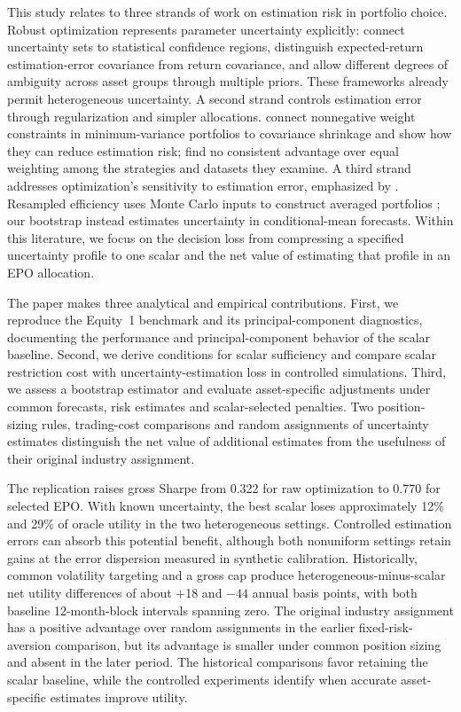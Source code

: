 This study relates to three strands of work on estimation risk in portfolio choice. Robust optimization represents parameter uncertainty explicitly: \citet{goldfarb2003} connect uncertainty sets to statistical confidence regions, \citet{ceria2006} distinguish expected-return estimation-error covariance from return covariance, and \citet{garlappi2007} allow different degrees of ambiguity across asset groups through multiple priors. These frameworks already permit heterogeneous uncertainty. A second strand controls estimation error through regularization and simpler allocations. \citet{jagannathan2003} connect nonnegative weight constraints in minimum-variance portfolios to covariance shrinkage and show how they can reduce estimation risk; \citet{demiguel2009} find no consistent advantage over equal weighting among the strategies and datasets they examine. A third strand addresses optimization's sensitivity to estimation error, emphasized by \citet{michaud1989}. Resampled efficiency uses Monte Carlo inputs to construct averaged portfolios \citep[Chapter~6]{michaud2008}; our bootstrap instead estimates uncertainty in conditional-mean forecasts. Within this literature, we focus on the decision loss from compressing a specified uncertainty profile to one scalar and the net value of estimating that profile in an EPO allocation.

The paper makes three analytical and empirical contributions. First, we reproduce the Equity~1 benchmark and its principal-component diagnostics, documenting the performance and principal-component behavior of the scalar baseline. Second, we derive conditions for scalar sufficiency and compare scalar restriction cost with uncertainty-estimation loss in controlled simulations. Third, we assess a bootstrap estimator and evaluate asset-specific adjustments under common forecasts, risk estimates and scalar-selected penalties. Two position-sizing rules, trading-cost comparisons and random assignments of uncertainty estimates distinguish the net value of additional estimates from the usefulness of their original industry assignment.

The replication raises gross Sharpe from 0.322 for raw optimization to 0.770 for selected EPO. With known uncertainty, the best scalar loses approximately 12\% and 29\% of oracle utility in the two heterogeneous settings. Controlled estimation errors can absorb this potential benefit, although both nonuniform settings retain gains at the error dispersion measured in synthetic calibration. Historically, common volatility targeting and a gross cap produce heterogeneous-minus-scalar net utility differences of about +18 and $-44$ annual basis points, with both baseline 12-month-block intervals spanning zero. The original industry assignment has a positive advantage over random assignments in the earlier fixed-risk-aversion comparison, but its advantage is smaller under common position sizing and absent in the later period. The historical comparisons favor retaining the scalar baseline, while the controlled experiments identify when accurate asset-specific estimates improve utility.
